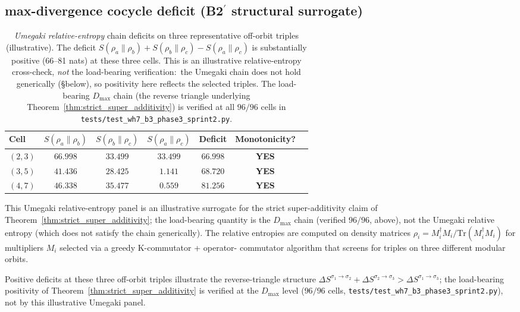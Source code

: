 \documentclass[11pt,a4paper]{article}
\theoremstyle{plain}
\theoremstyle{definition}
\newcommand{\Tr}{\mathrm{Tr}}
\newcommand{\DelS}[2]{\Delta S^{\sigma_{#1}\to\sigma_{#2}}}
\begin{document}
\subsection{max-divergence cocycle deficit
(B2$^{\prime}$ structural surrogate)}
\label{sec:uhlmann_panel}

\begin{table}[h]
\centering
\begin{tabular}{lcccccc}
\toprule
Cell & $S(\rho_a\|\rho_b)$ & $S(\rho_b\|\rho_c)$ & $S(\rho_a\|\rho_c)$ & Deficit & Monotonicity? \\
\midrule
$(2,3)$ & $66.998$ & $33.499$ & $33.499$ & $\mathbf{66.998}$ & \textbf{YES} \\
$(3,5)$ & $41.436$ & $28.425$ & $1.141$ & $\mathbf{68.720}$ & \textbf{YES} \\
$(4,7)$ & $46.338$ & $35.477$ & $0.559$ & $\mathbf{81.256}$ & \textbf{YES} \\
\bottomrule
\end{tabular}
\caption{\emph{Umegaki relative-entropy} chain deficits on three
representative off-orbit triples (illustrative). The deficit
$S(\rho_a\|\rho_b)+S(\rho_b\|\rho_c)-S(\rho_a\|\rho_c)$ is
substantially positive (66--81 nats) at these three cells. This is an
illustrative relative-entropy cross-check, \emph{not} the load-bearing
verification:\ the Umegaki chain does not hold generically (\S below),
so positivity here reflects the selected triples. The load-bearing
\emph{$D_{\max}$} chain (the reverse triangle underlying
Theorem~\ref{thm:strict_super_additivity}) is verified at all $96/96$
cells in \texttt{tests/test\_wh7\_b3\_phase3\_sprint2.py}.}
\label{tab:uhlmann_panel}
\end{table}

This Umegaki relative-entropy panel is an illustrative surrogate for
the strict super-additivity claim of
Theorem~\ref{thm:strict_super_additivity}; the load-bearing quantity is
the $D_{\max}$ chain (verified $96/96$, above), not the Umegaki
relative entropy (which does not satisfy the chain generically). The relative entropies
are computed on density matrices
$\rho_{i}=M_{i}^{\dagger}M_{i}/\Tr(M_{i}^{\dagger}M_{i})$ for
multipliers $M_{i}$ selected via a greedy K-commutator + operator-
commutator algorithm that screens for triples on three different
modular orbits.

Positive deficits at these three off-orbit triples illustrate the
reverse-triangle structure $\DelS{1}{2}+\DelS{2}{3}>\DelS{1}{3}$; the
load-bearing positivity of Theorem~\ref{thm:strict_super_additivity} is
verified at the $D_{\max}$ level ($96/96$ cells,
\texttt{tests/test\_wh7\_b3\_phase3\_sprint2.py}), not by this
illustrative Umegaki panel.
\end{document}
